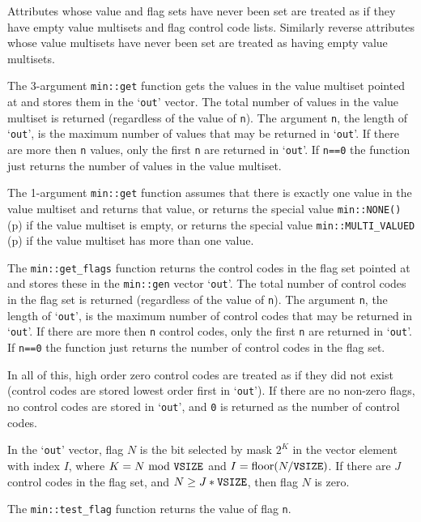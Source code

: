 \documentclass[12pt]{article}
\newcommand{\pagref}[1]{p\pageref{#1}}
\newcommand{\EOL}{\penalty \exhyphenpenalty}
\begin{document}
Attributes whose value and flag sets have never been set are treated
as if they have empty value multisets and flag control code lists.
Similarly reverse attributes
whose value multisets have never been set are treated as having empty value
multisets.

The 3-argument {\tt min::\EOL get} function gets the values in the value
multiset pointed at and stores them in the `{\tt out}' vector.
The total number of values in the value
multiset is returned (regardless of the value of {\tt n}).
The argument {\tt n}, the length of `{\tt out}',
is the maximum number of values that may be returned in `{\tt out}'.
If there are more then {\tt n} values, only the first {\tt n}
are returned in `{\tt out}'.
If {\tt n==0} the function just returns
the number of values in the value multiset.

The 1-argument {\tt min::\EOL get} function assumes that there is exactly
one value in the value multiset
and returns that value, or returns the special value
\verb|min::NONE()| (\pagref{MIN::NONE}) if the value multiset is empty,
or returns the special value
\verb|min::MULTI_VALUED| (\pagref{MIN::MULTI_VALUED}) if the value multiset
has more than one value.

The {\tt min::\EOL get\_\EOL flags}
function returns the control codes in the flag set pointed at and stores
these in the \verb|min::gen| vector `{\tt out}'.
The total number of control codes in the flag set is returned
(regardless of the value of {\tt n}).
The argument {\tt n}, the length of `{\tt out}',
is the maximum number of control codes that may be returned in `{\tt out}'.
If there are more then {\tt n} control codes, only the first {\tt n}
are returned in `{\tt out}'.
If {\tt n==0} the function just returns
the number of control codes in the flag set.

In all of this, high order zero control codes are treated as if
they did not exist (control codes are stored lowest order first
in `{\tt out}').  If there are no non-zero flags, no control codes
are stored in `{\tt out}', and {\tt 0} is returned as the number of
control codes.

In the `{\tt out}' vector, flag $N$ is the bit selected by mask $2^K$
in the vector element with index $I$, where $K=N~\mbox{mod}~\mbox{\tt VSIZE}$
and $I=\mbox{floor}(N/\mbox{\tt VSIZE})$.
If there are $J$ control codes
in the flag set, and $N\geq J*\mbox{\tt VSIZE}$, then
flag $N$ is zero.

The {\tt min::\EOL test\_\EOL flag} function returns the value
of flag {\tt n}.
\end{document}
